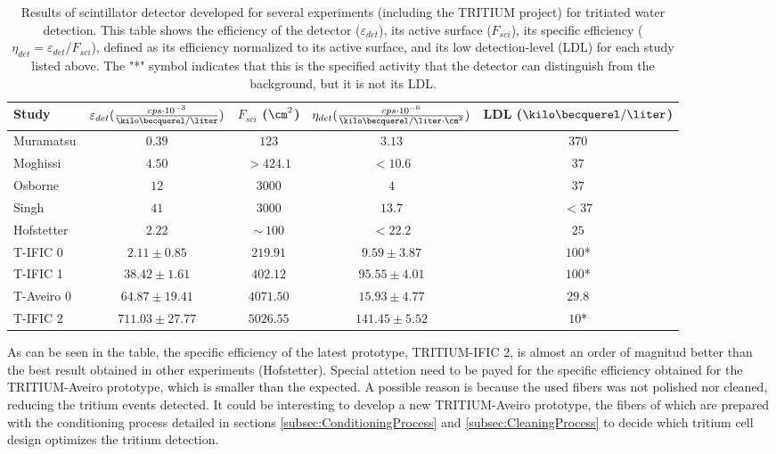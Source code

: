 \begin{table}[htbp]
\centering{}%
\begin{tabular}{lcccc}
\toprule 
Study & \parbox{5.5em}{$\varepsilon_{det}(\frac{cps \cdot{} 10^{-3}}{\kilo\becquerel/\liter})$}  & \parbox{4.5em}{$F_{sci}$ ($\cm^2$)}  & \parbox{6.5em}{$\eta_{det}(\frac{cps \cdot{} 10^{-6}}{\kilo\becquerel/ \liter \cdot{} \cm^2})$} & LDL ($\kilo\becquerel / \liter$) \tabularnewline
\midrule
\midrule 
Muramatsu & $0.39$ & $123$ & $3.13$ & $370$ \tabularnewline
Moghissi & $4.50$ & $>424.1$ & $<10.6$ & $37$ \tabularnewline
Osborne & $12$ & $3000$ & $4$ & $37$ \tabularnewline
Singh & $41$ & $3000$ & $13.7$ & $<37$ \tabularnewline
Hofstetter & $2.22$ & $\sim~100$ & $<22.2$ & $25$ \tabularnewline
T-IFIC 0 & $2.11 \pm 0.85$ & $219.91$ & $9.59 \pm 3.87$ & $100$* \tabularnewline
T-IFIC 1 & $38.42 \pm 1.61$ & $402.12$ & $95.55 \pm 4.01$ & $100$* \tabularnewline
T-Aveiro 0 & $64.87 \pm 19.41$ & $4071.50$ & $15.93 \pm 4.77$ & $29.8$ \tabularnewline
T-IFIC 2 & $711.03 \pm 27.77$ & $5026.55$ & $141.45 \pm 5.52$ & $10$* \tabularnewline
\bottomrule
\end{tabular}
\caption{Results of scintillator detector developed for several experiments (including the TRITIUM project) for tritiated water detection. This table shows the efficiency of the detector ($\varepsilon_{det}$), its active surface ($F_{sci}$), its specific efficiency ($\eta_{det}=\varepsilon_{det}/F_{sci}$), defined as its efficiency normalized to its active surface, and its low detection-level (LDL) for each study listed above. The "*" symbol indicates that this is the specified activity that the detector can distinguish from the background, but it is not its LDL.}
\label{tab:ComparisonResultsTri}
\end{table}

As can be seen in the table, the specific efficiency of the latest prototype, TRITIUM-IFIC 2, is almost an order of magnitud better than the best result obtained in other experiments (Hofstetter). Special attetion need to be payed for the specific efficiency obtained for the TRITIUM-Aveiro prototype, which is smaller than the expected. A possible reason is because the used fibers was not polished nor cleaned, reducing the tritium events detected. It could be interesting to develop a new TRITIUM-Aveiro prototype, the fibers of which are prepared with the conditioning process detailed in sections \ref{subsec:ConditioningProcess} and \ref{subsec:CleaningProcess} to decide which tritium cell design optimizes the tritium detection. 

